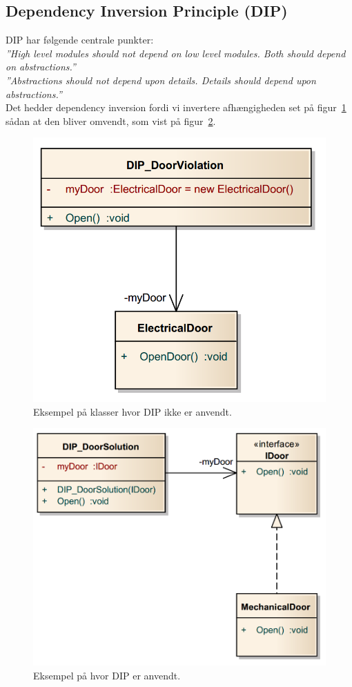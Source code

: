 \subsection{Dependency Inversion Principle (DIP)}
DIP har følgende centrale punkter:\\

\textit{''High level modules should not depend on low level modules. Both should depend on abstractions.''}\\

\textit{''Abstractions should not depend upon details. Details should depend upon abstractions.''}\\

Det hedder dependency inversion fordi vi invertere afhængigheden set på figur~\ref{fig:dipwrong} sådan at den bliver omvendt, som vist på figur~\ref{fig:dipright}.\\


\begin{figure}[h]
	\centering
	\includegraphics[width=0.5\linewidth]{figs/DIP/dipwrong}
	\caption[DIP eksempel 1]{Eksempel på klasser hvor DIP ikke er anvendt.}
	\label{fig:dipwrong}
\end{figure}

\begin{figure}[h]
	\centering
	\includegraphics[width=0.5\linewidth]{figs/DIP/dipright}
	\caption[DIP eksempel 2]{Eksempel på hvor DIP er anvendt.}
	\label{fig:dipright}
\end{figure}

